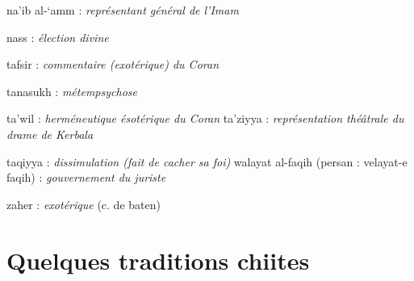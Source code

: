 na'ib al-`amm : \emph{représentant général de l'Imam}

nass : \emph{élection divine}

tafsir : \emph{commentaire (exotérique) du Coran}

tanasukh : \emph{métempsychose}

ta'wil : \emph{herméneutique ésotérique du Coran} ta'ziyya :
\emph{représentation théâtrale du drame de Kerbala}

taqiyya : \emph{dissimulation (fait de cacher sa foi)} walayat al-faqih
(persan : velayat-e faqih) : \emph{gouvernement du juriste}

zaher : \emph{exotérique} (c. de baten)

\section{{Quelques traditions chiites}}
 


 



 


 